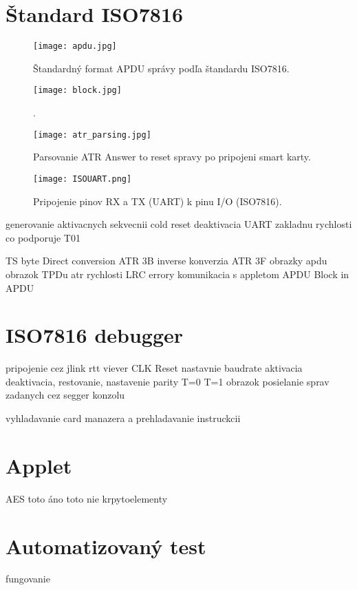 \documentclass[12pt,a4wide,oneside,openright]{report}
\begin{document}
\section{Štandard ISO7816}

	\begin{figure*}[h]
		\centering
		\texttt{[image: apdu.jpg]}
		\caption{Štandardný format APDU správy podľa štandardu ISO7816\cite{smartcard}.}
		\label{f:apdu}
	\end{figure*}
	
	\begin{figure*}[h]
		\centering
		\texttt{[image: block.jpg]}
		\caption{\cite{SmartCardTutorial}.}
		\label{f:tpdu}
	\end{figure*}


	\begin{figure*}[h]
		\centering
		\texttt{[image: atr\_parsing.jpg]}
		\caption{Parsovanie ATR Answer to reset spravy po pripojeni smart karty\cite{smartcard}.}
		\label{f:atr}
	\end{figure*}


	
	\begin{figure*}[h]
		\centering
		\texttt{[image: ISOUART.png]}
		\caption{Pripojenie pinov RX a TX (UART) k pinu I/O (ISO7816).}
		\label{f:isouart}
	\end{figure*}
generovanie aktivacnych sekvecnii cold reset
deaktivacia
UART
zakladnu
rychlosti 
co podporuje
T01

TS byte Direct conversion ATR 3B
inverse konverzia ATR 3F
obrazky apdu
obrazok TPDu
atr
rychlosti
LRC
errory
komunikacia s appletom
APDU Block in APDU

\section{ISO7816 debugger}
pripojenie
cez jlink rtt viever
	CLK
	Reset
nastavnie baudrate
aktivacia deaktivacia, restovanie,
nastavenie parity
T=0 T=1
obrazok
posielanie sprav zadanych cez segger konzolu

vyhladavanie card manazera  a prehladavanie instruckcii

\section{Applet}
AES
toto áno
toto nie
krpytoelementy

\section{Automatizovaný test}
fungovanie
\end{document}
